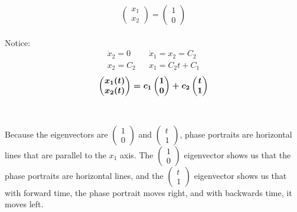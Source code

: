 \documentclass[12pt]{article}
\begin{document}
$$
\begin{pmatrix}
	x_1 \\
	x_2
\end{pmatrix} = 
\begin{pmatrix}
	1 \\
	0
\end{pmatrix}
$$ \\
Notice:
\begin{align*}
	\dot{x}_2 = 0 && \dot{x}_1 = x_2 = C_2 \\
	x_2 = C_2 && x_1 = C_2t + C_1
\end{align*}
$$
\boldmath
\begin{pmatrix}
	x_1(t) \\
	x_2(t)
\end{pmatrix} = 
c_1 
\begin{pmatrix}
	1 \\
	0
\end{pmatrix} + 
c_2 
\begin{pmatrix}
	t \\
	1
\end{pmatrix}
$$ \\ \\
Because the eigenvectors are $
\begin{pmatrix}
1 \\
0
\end{pmatrix} $ and 
$
\begin{pmatrix}
t \\
1
\end{pmatrix}$,
phase portraits are horizontal lines that are parallel to the $x_1$ axis. The $
\begin{pmatrix}
1 \\
0
\end{pmatrix} $ eigenvector shows us that the phase portraits are horizontal lines, and the $
\begin{pmatrix}
t \\
1
\end{pmatrix}$ eigenvector shows us that with forward time, the phase portrait moves right, and with backwards time, it moves left.

\newpage 
\end{document}
